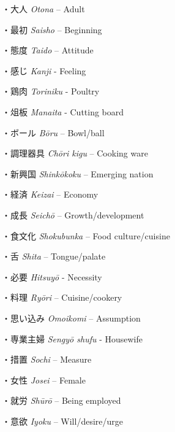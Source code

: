 \par{・大人 \emph{Otona }– Adult }

\par{・最初 \emph{Saisho }– Beginning }

\par{・態度 \emph{Taido }– Attitude }

\par{・感じ \emph{Kanji }- Feeling }

\par{・鶏肉 \emph{Toriniku }- Poultry }

\par{・俎板 \emph{Manaita }- Cutting board }

\par{・ボール \emph{Bōru }– Bowl\slash ball }

\par{・調理器具 \emph{Chōri kigu }– Cooking ware }

\par{・新興国 \emph{Shinkōkoku }– Emerging nation }

\par{・経済 \emph{Keizai }– Economy }

\par{・成長 \emph{Seichō }– Growth\slash development }

\par{・食文化 \emph{Shokubunka }– Food culture\slash cuisine }

\par{・舌 \emph{Shita }– Tongue\slash palate }

\par{・必要 \emph{Hitsuyō }- Necessity }

\par{・料理 \emph{Ryōri }– Cuisine\slash cookery }

\par{・思い込み \emph{Omoikomi }– Assumption }

\par{・専業主婦 \emph{Sengyō shufu }- Housewife }

\par{・措置 \emph{Sochi }– Measure }

\par{・女性 \emph{Josei }– Female }

\par{・就労 \emph{Shūrō }– Being employed }

\par{・意欲 \emph{Iyoku }– Will\slash desire\slash urge }

